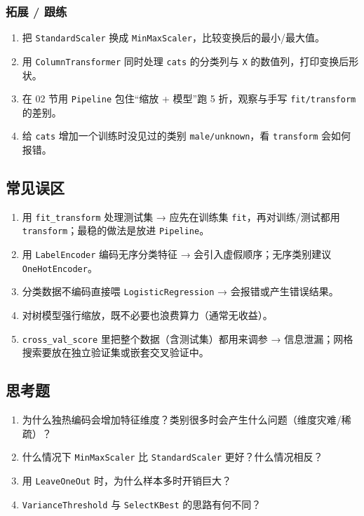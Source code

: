 \subsubsection{拓展 / 跟练}\label{ux62d3ux5c55-ux8ddfux7ec3-19}

\begin{enumerate}
\def\labelenumi{\arabic{enumi}.}
\tightlist
\item
  把 \texttt{StandardScaler} 换成
  \texttt{MinMaxScaler}，比较变换后的最小/最大值。
\item
  用 \texttt{ColumnTransformer} 同时处理 \texttt{cats} 的分类列与
  \texttt{X} 的数值列，打印变换后形状。
\item
  在 02 节用 \texttt{Pipeline} 包住``缩放 + 模型''跑 5 折，观察与手写
  \texttt{fit/transform} 的差别。
\item
  给 \texttt{cats} 增加一个训练时没见过的类别 \texttt{male/unknown}，看
  \texttt{transform} 会如何报错。
\end{enumerate}

\subsection{常见误区}\label{ux5e38ux89c1ux8befux533a-22}

\begin{enumerate}
\def\labelenumi{\arabic{enumi}.}
\tightlist
\item
  用 \texttt{fit\_transform} 处理测试集 → 应先在训练集
  \texttt{fit}，再对训练/测试都用 \texttt{transform}；最稳的做法是放进
  \texttt{Pipeline}。
\item
  用 \texttt{LabelEncoder} 编码无序分类特征 →
  会引入虚假顺序；无序类别建议 \texttt{OneHotEncoder}。
\item
  分类数据不编码直接喂 \texttt{LogisticRegression} →
  会报错或产生错误结果。
\item
  对树模型强行缩放，既不必要也浪费算力（通常无收益）。
\item
  \texttt{cross\_val\_score} 里把整个数据（含测试集）都用来调参 →
  信息泄漏；网格搜索要放在独立验证集或嵌套交叉验证中。
\end{enumerate}

\subsection{思考题}\label{ux601dux8003ux9898-24}

\begin{enumerate}
\def\labelenumi{\arabic{enumi}.}
\tightlist
\item
  为什么独热编码会增加特征维度？类别很多时会产生什么问题（维度灾难/稀疏）？
\item
  什么情况下 \texttt{MinMaxScaler} 比 \texttt{StandardScaler}
  更好？什么情况相反？
\item
  用 \texttt{LeaveOneOut} 时，为什么样本多时开销巨大？
\item
  \texttt{VarianceThreshold} 与 \texttt{SelectKBest} 的思路有何不同？
\end{enumerate}

